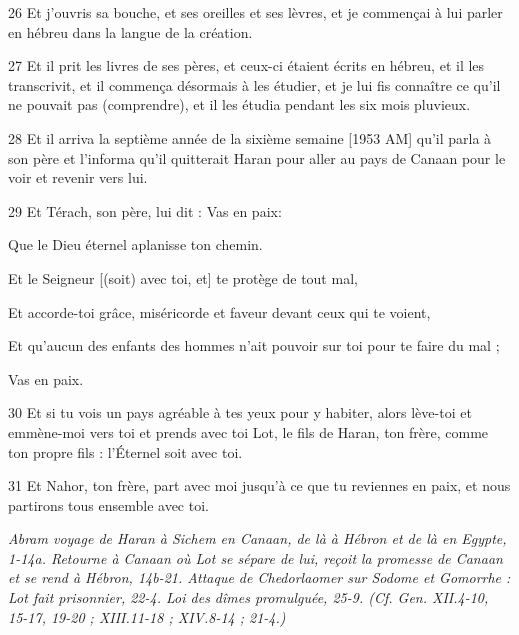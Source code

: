 \par 26 Et j'ouvris sa bouche, et ses oreilles et ses lèvres, et je commençai à lui parler en hébreu dans la langue de la création.
\par 27 Et il prit les livres de ses pères, et ceux-ci étaient écrits en hébreu, et il les transcrivit, et il commença désormais à les étudier, et je lui fis connaître ce qu'il ne pouvait pas (comprendre), et il les étudia pendant les six mois pluvieux.
\par 28 Et il arriva la septième année de la sixième semaine [1953 AM] qu'il parla à son père et l'informa qu'il quitterait Haran pour aller au pays de Canaan pour le voir et revenir vers lui.
\par 29 Et Térach, son père, lui dit : Vas en paix:
\par    
\par     Que le Dieu éternel aplanisse ton chemin.  
\par     Et le Seigneur [(soit) avec toi, et] te protège de tout mal,  
\par     Et accorde-toi grâce, miséricorde et faveur devant ceux qui te voient,  
\par     Et qu'aucun des enfants des hommes n'ait pouvoir sur toi pour te faire du mal ;  
\par     Vas en paix.
\par    
\par 30 Et si tu vois un pays agréable à tes yeux pour y habiter, alors lève-toi et emmène-moi vers toi et prends avec toi Lot, le fils de Haran, ton frère, comme ton propre fils : l'Éternel soit avec toi.
\par 31 Et Nahor, ton frère, part avec moi jusqu'à ce que tu reviennes en paix, et nous partirons tous ensemble avec toi.


\par \textit{Abram voyage de Haran à Sichem en Canaan, de là à Hébron et de là en Egypte, 1-14a. Retourne à Canaan où Lot se sépare de lui, reçoit la promesse de Canaan et se rend à Hébron, 14b-21. Attaque de Chedorlaomer sur Sodome et Gomorrhe : Lot fait prisonnier, 22-4. Loi des dîmes promulguée, 25-9. (Cf. Gen. XII.4-10, 15-17, 19-20 ; XIII.11-18 ; XIV.8-14 ; 21-4.)}

